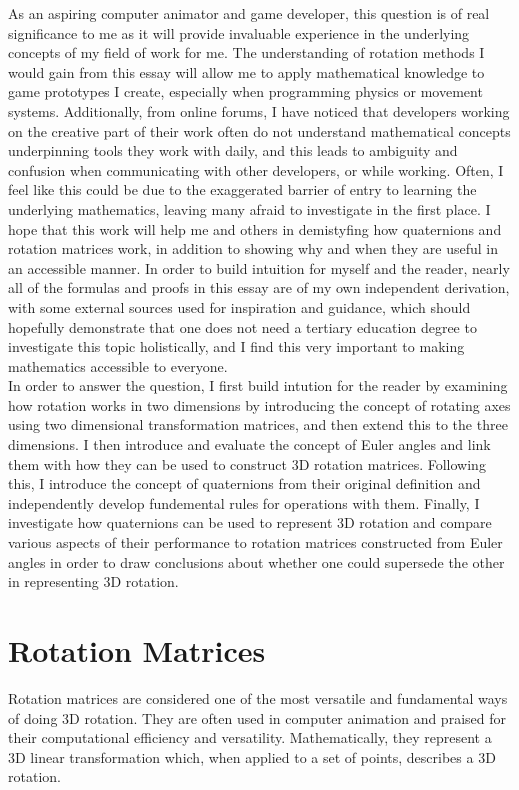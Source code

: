 \documentclass[12pt, a4paper]{article}
\begin{document}
As an aspiring computer animator and game developer, this question is of real
significance to me as it will provide invaluable experience in the underlying
concepts of my field of work for me. The understanding of rotation methods I
would gain from this essay will allow me to apply mathematical knowledge to game
prototypes I create, especially when programming physics or movement systems.
Additionally, from online forums, I have noticed that developers working on the
creative part of their work often do not understand mathematical concepts
underpinning tools they work with daily, and this leads to ambiguity and
confusion when communicating with other developers, or while working. Often, I
feel like this could be due to the exaggerated barrier of entry to learning the
underlying mathematics, leaving many afraid to investigate in the first place. I
hope that this work will help me and others in demistyfing how quaternions and
rotation matrices work, in addition to showing why and when they are useful in
an accessible manner. In order to build intuition for myself and the reader,
nearly all of the formulas and proofs in this essay are of my own independent
derivation, with some external sources used for inspiration and guidance, which
should hopefully demonstrate that one does not need a tertiary education degree
to investigate this topic holistically, and I find this very important to making
mathematics accessible to everyone. \\

In order to answer the question, I first build intution for the reader by
examining how rotation works in two dimensions by introducing the concept of
rotating axes using two dimensional transformation matrices, and then extend
this to the three dimensions. I then introduce and evaluate the concept of Euler
angles and link them with how they can be used to construct 3D rotation
matrices. Following this, I introduce the concept of quaternions from their
original definition and independently develop fundemental rules for operations
with them. Finally, I investigate how quaternions can be used to represent 3D
rotation and compare various aspects of their performance to rotation matrices
constructed from Euler angles in order to draw conclusions about whether one
could supersede the other in representing 3D rotation.

\pagebreak

\section{Rotation Matrices}
Rotation matrices are considered one of the most versatile and fundamental ways
of doing 3D rotation. They are often used in computer animation and praised for
their computational efficiency and versatility. Mathematically, they represent a
3D linear transformation which, when applied to a set of points, describes a 3D
rotation.
\end{document}

